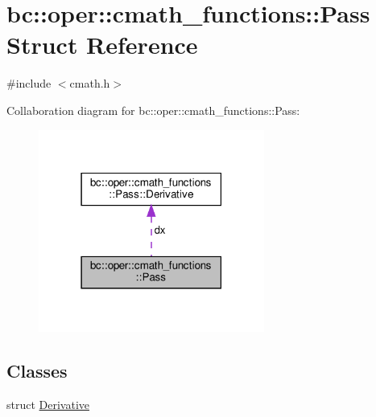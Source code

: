 \hypertarget{structbc_1_1oper_1_1cmath__functions_1_1Pass}{}\section{bc\+:\+:oper\+:\+:cmath\+\_\+functions\+:\+:Pass Struct Reference}
\label{structbc_1_1oper_1_1cmath__functions_1_1Pass}


{\ttfamily \#include $<$cmath.\+h$>$}



Collaboration diagram for bc\+:\+:oper\+:\+:cmath\+\_\+functions\+:\+:Pass\+:\nopagebreak
\begin{figure}[H]
\begin{center}
\leavevmode
\includegraphics[width=210pt]{structbc_1_1oper_1_1cmath__functions_1_1Pass__coll__graph}
\end{center}
\end{figure}
\subsection*{Classes}
\begin{DoxyCompactItemize}
\item 
struct \hyperlink{structbc_1_1oper_1_1cmath__functions_1_1Pass_1_1Derivative}{Derivative}
\end{DoxyCompactItemize}

